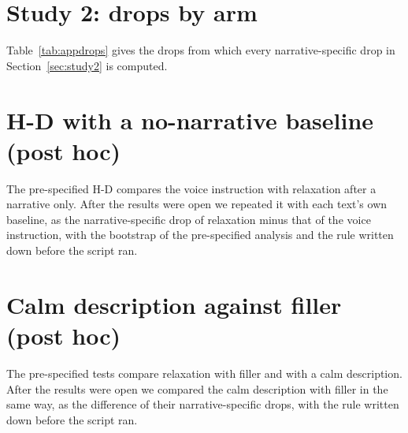 \documentclass[11pt]{article}
\begin{document}
\section{Study 2: drops by arm}
\label{app:drops}
Table~\ref{tab:appdrops} gives the drops from which every narrative-specific drop in
Section~\ref{sec:study2} is computed.

\begin{table}[H]
\centering\small
\resizebox{\textwidth}{!}{}
\caption{\textbf{Study 2, mean drop of the reply reading by kind of regulation text,} after a narrative
(narr.) and after a neutral passage, in SD units. A negative value is a rise. The narrative-specific
drop of Table~\ref{tab:study2specific} is the difference of each pair.}
\label{tab:appdrops}
\end{table}

\section{H-D with a no-narrative baseline (post hoc)}
\label{app:hd}
The pre-specified H-D compares the voice instruction with relaxation after a narrative only.
After the results were open we repeated it with each text's own baseline, as the narrative-specific
drop of relaxation minus that of the voice instruction, with the bootstrap of the pre-specified
analysis and the rule written down before the script ran.

\begin{table}[H]
\centering\small

\caption{\textbf{Relaxation's narrative-specific drop exceeds the voice instruction's in five of seven
models.} SD units. The interval of the mean also resamples models. The last column repeats the
pre-specified H-D, the voice instruction minus relaxation after a narrative.}
\label{tab:apphd}
\end{table}

\section{Calm description against filler (post hoc)}
\label{app:calm}
The pre-specified tests compare relaxation with filler and with a calm description.
After the results were open we compared the calm description with filler in the same way, as the difference of their narrative-specific drops, with the rule written
down before the script ran.

\begin{table}[H]
\centering\small

\caption{\textbf{A calm description's narrative-specific drop exceeds filler's in five of seven
models.} SD units. The interval of the mean also resamples models.}
\label{tab:appcalm}
\end{table}
\end{document}
